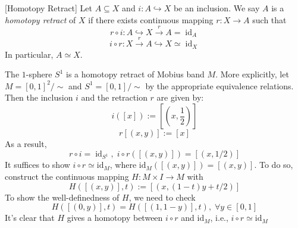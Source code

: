 \begin{definition} \label{def:homotopy_retract} [Homotopy Retract] Let \(A \subseteq  X\) and \(i : A \hookrightarrow  X\) be an inclusion. We say \(A\) is a \emph{homotopy retract} of \(X\) if there exists continuous mapping \(r : X \rightarrow  A\) such that
\[
r \circ  i : A \hookrightarrow  X\overset{r}{ \rightarrow  }A = {\operatorname{id}}_{A}
\]
\[
i \circ  r : X\overset{r}{ \rightarrow  }A \hookrightarrow  X \simeq  {\operatorname{id}}_{X}
\]
In particular, \(A \simeq  X\).
\end{definition}
\begin{example} The $1$-sphere \({S}^{1}\) is a homotopy retract of Mobius band \(M\). More explicitly, 
let \(M = {\left\lbrack  0, 1\right\rbrack  }^{2}/ \sim\) and \({S}^{1} = \left\lbrack  {0, 1}\right\rbrack  / \sim\) by the appropriate equivalence relations. Then the inclusion \(i\) and the retraction \(r\) are given by:
\[i(\left\lbrack  x\right\rbrack)  :=  \left\lbrack  \left( {x, \frac{1}{2}}\right) \right\rbrack
\]
\[r\left\lbrack  \left( {x, y}\right) \right\rbrack  :=  \left\lbrack  x\right\rbrack
\]
As a result, 
\[
r \circ  i = {\operatorname{id}}_{{S}^{1}}, \;i \circ  r\left( \left\lbrack  \left( {x, y}\right) \right\rbrack  \right)  = \left\lbrack  \left( {x, 1/2}\right) \right\rbrack
\]
It suffices to show \(i \circ  r \simeq  {\mathrm{{id}}}_{M}\), where \({\mathrm{{id}}}_{M}\left( \left\lbrack  \left( {x, y}\right) \right\rbrack  \right)  = \left\lbrack  \left( {x, y}\right) \right\rbrack\).
To do so, construct the continuous mapping \(H : M \times  I \rightarrow  M\) with
\[
H\left( {\left\lbrack  \left( {x, y}\right) \right\rbrack , t}\right)  \mathrel{\text{ := }} \left\lbrack  \left( {x, \left( {1 - t}\right) y + t/2}\right) \right\rbrack
\]
To show the well-definedness of \(H\), we need to check
\[
H\left( {\left\lbrack  \left( {0, y}\right) \right\rbrack , t}\right)  = H\left( {\left\lbrack  \left( {1, 1 - y}\right) \right\rbrack , t}\right), \;\forall y \in  \left\lbrack  {0, 1}\right\rbrack
\]
It’s clear that \(H\) gives a homotopy between \(i \circ  r\) and \({\mathrm{{id}}}_{M}\), i.e., \(i \circ  r \simeq  {\mathrm{{id}}}_{M}\)
\end{example}

